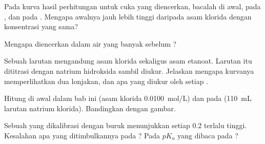 \begin{exercise}[$\star\star$]\label{exo:g12:ph-conductivity-titrations:10}
Pada kurva hasil perhitungan untuk cuka yang diencerkan, bacalah  di
awal, pada , dan pada . Mengapa 
awalnya jauh lebih tinggi daripada  asam klorida dengan konsentrasi
yang sama?
\end{exercise}

\begin{exercise}[$\star\star$]\label{exo:g12:ph-conductivity-titrations:11}
Mengapa  diencerkan dalam air yang banyak sebelum
?
\end{exercise}

\begin{exercise}[$\star\star\star$]\label{exo:g12:ph-conductivity-titrations:12}
Sebuah larutan mengandung asam klorida sekaligus asam etanoat. Larutan
itu dititrasi dengan natrium hidroksida sambil  diukur. Jelaskan
mengapa kurvanya memperlihatkan dua lonjakan, dan apa yang diukur oleh
setiap .
\end{exercise}

\begin{exercise}[$\star\star\star$]\label{exo:g12:ph-conductivity-titrations:13}
Hitung  di awal  dalam bab ini (asam
klorida \qty{0.0100}{mol/L}) dan pada  (\qty{110}{mL}
larutan natrium klorida). Bandingkan dengan gambar.
\end{exercise}

\begin{exercise}[$\star\star\star$]\label{exo:g12:ph-conductivity-titrations:14}
Sebuah  yang dikalibrasi dengan buruk menunjukkan setiap  0.2
terlalu tinggi. Kesalahan apa yang ditimbulkannya pada 
? Pada $pK_a$ yang dibaca pada ?
\end{exercise}

